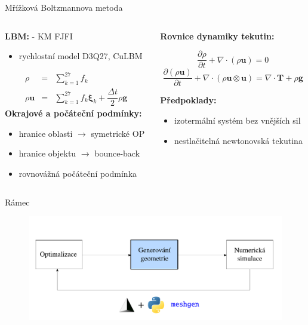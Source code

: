 \documentclass[aspectratio=169,xcolor=dvipsnames]{beamer}
\newcommand{\vect}[1]{\mathbf{#1}}
\begin{document}
\begin{frame}{Mřížková Boltzmannova metoda}
	\begin{columns}[T] %
		\begin{column}{.45\textwidth}
			\textbf{LBM:} - KM FJFI\\
			\begin{itemize}
				\item rychlostní model D3Q27, CuLBM
			\end{itemize}
		\begin{eqnarray*}
			\rho &=& \sum_{k=1}^{27} f_{k}\\
			\rho \vect{u} &=& \sum_{k=1}^{27} f_{k} \boldsymbol{\xi}_{k} + \dfrac{\Delta t}{2} \rho \boldsymbol{g}
		\end{eqnarray*}
			\textbf{Okrajové a počáteční podmínky:}\\
			\begin{itemize}
				\item hranice oblasti $ \rightarrow $ symetrické OP
				\item hranice objektu $ \rightarrow $ bounce-back
				\item rovnovážná počáteční podmínka
			\end{itemize}
		\end{column}%
		\begin{column}{.5\textwidth}
			\textbf{Rovnice dynamiky tekutin:}
			\vspace{-13pt}
			\begin{center}
				$$\frac{\partial \rho}{\partial t} + \nabla \cdot (\rho \vect{u}) = 0 $$
				$$\frac{\partial (\rho \vect{u})}{\partial t} + \nabla \cdot (\rho \vect{u} \otimes \vect{u}) = \nabla \cdot \mathbf{T} + \rho \boldsymbol{g}$$
			\end{center}%
			\vspace{11pt}
			\textbf{Předpoklady:}\\[2pt]
			\begin{itemize}
				\item izotermální systém bez vnějších sil
				\item nestlačitelná newtonovská tekutina
			\end{itemize}
		\end{column}%
	\end{columns}
\end{frame}
\begin{frame}{Rámec}
	\addtocounter{framenumber}{-1}
	\begin{figure}
		\includegraphics[width=0.95\linewidth, trim={0 -0.1cm 0 0}, clip]{Images/framework-cz-2.pdf}
	\end{figure}
\end{frame}
\end{document}
